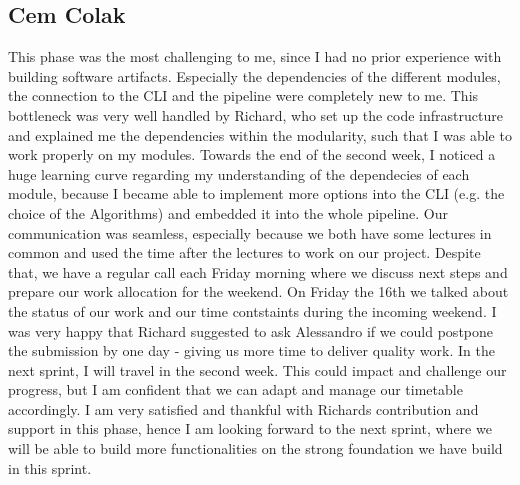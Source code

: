 \documentclass[12pt,a4paper]{article}
\begin{document}
\subsection{Cem Colak}
This phase was the most challenging to me, since I had no prior experience with building software artifacts. Especially the dependencies of the different modules, the connection to the CLI and the pipeline were completely new to me. This bottleneck was very well handled by Richard, who set up the code infrastructure and explained me the dependencies within the modularity, such that I was able to work properly on my modules. Towards the end of the second week, I noticed a huge learning curve regarding my understanding of the dependecies of each module, because I became able to implement more options into the CLI (e.g. the choice of the Algorithms) and embedded it into the whole pipeline. Our communication was seamless, especially because we both have some lectures in common and used the time after the lectures to work on our project. Despite that, we have a regular call each Friday morning where we discuss next steps and prepare our work allocation for the weekend. On Friday the 16th we talked about the status of our work and our time contstaints during the incoming weekend. I was very happy that Richard suggested to ask Alessandro if we could postpone the submission by one day - giving us more time to deliver quality work. 
In the next sprint, I will travel in the second week. This could impact and challenge our progress, but I am confident that we can adapt and manage our timetable accordingly. I am very satisfied and thankful with Richards contribution and support in this phase, hence I am looking forward to the next sprint, where we will be able to build more functionalities on the strong foundation we have build in this sprint.
\end{document}
